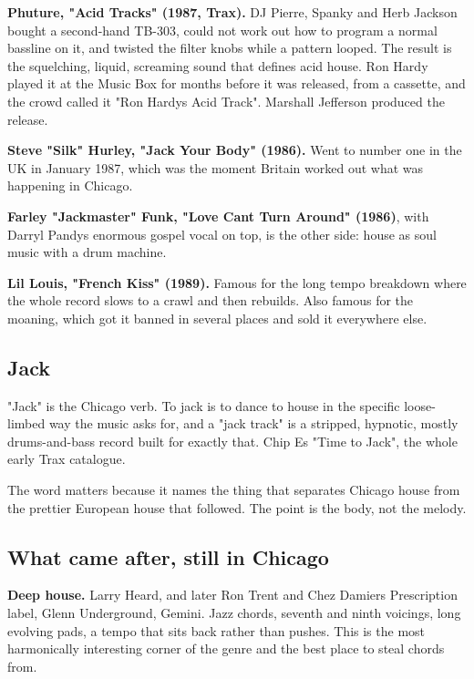 \textbf{Phuture, "Acid Tracks" (1987, Trax).} DJ Pierre, Spanky and Herb Jackson bought a
second-hand TB-303, could not work out how to program a normal bassline on it, and twisted
the filter knobs while a pattern looped. The result is the squelching, liquid, screaming
sound that defines acid house. Ron Hardy played it at the Music Box for months before it
was released, from a cassette, and the crowd called it "Ron Hardy\textquotesingle s Acid Track". Marshall
Jefferson produced the release.

\textbf{Steve "Silk" Hurley, "Jack Your Body" (1986).} Went to number one in the UK in January
1987, which was the moment Britain worked out what was happening in Chicago.

\textbf{Farley "Jackmaster" Funk, "Love Can\textquotesingle t Turn Around" (1986)}, with Darryl Pandy\textquotesingle s enormous
gospel vocal on top, is the other side: house as soul music with a drum machine.

\textbf{Lil Louis, "French Kiss" (1989).} Famous for the long tempo breakdown where the whole
record slows to a crawl and then rebuilds. Also famous for the moaning, which got it banned
in several places and sold it everywhere else.

\subsection{Jack}\label{th02_chicago-jack}

"Jack" is the Chicago verb. To jack is to dance to house in the specific loose-limbed way
the music asks for, and a "jack track" is a stripped, hypnotic, mostly drums-and-bass record
built for exactly that. Chip E\textquotesingle s "Time to Jack", the whole early Trax catalogue.

The word matters because it names the thing that separates Chicago house from the
prettier European house that followed. The point is the body, not the melody.

\subsection{What came after, still in Chicago}\label{th02_chicago-what-came-after-still-in-chicago}

\textbf{Deep house.} Larry Heard, and later Ron Trent and Chez Damier\textquotesingle s Prescription label,
Glenn Underground, Gemini. Jazz chords, seventh and ninth voicings, long evolving pads, a
tempo that sits back rather than pushes. This is the most harmonically interesting corner
of the genre and the best place to steal chords from.

